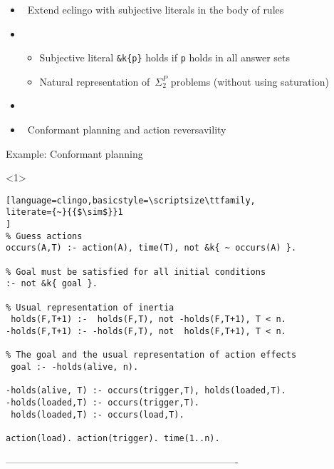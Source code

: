 \begin{frame}{\eclingo}
  \begin{itemize}
  \item {} \ Extend eclingo with subjective literals in the body of rules
  \item {} \
  \begin{itemize}
    \item Subjective literal \texttt{\&k\{p\}} holds if \texttt{p} holds in all answer sets
    \item Natural representation of~$\Sigma^P_2$ problems (without using saturation)
  \end{itemize}
  \item {} \ \cite{cafagarosc20a}
  \item {} \ Conformant planning \cite{cafafa21a} and action reversavility \cite{famoch21a}
  \end{itemize}
\end{frame}
\begin{frame}[fragile]{Example: Conformant planning}
\begin{onlyenv}<1>
\begin{lstlisting}[language=clingo,basicstyle=\scriptsize\ttfamily,
literate={~}{{$\sim$}}1
]
% Guess actions
occurs(A,T) :- action(A), time(T), not &k{ ~ occurs(A) }.

% Goal must be satisfied for all initial conditions
:- not &k{ goal }.

% Usual representation of inertia
 holds(F,T+1) :-  holds(F,T), not -holds(F,T+1), T < n.
-holds(F,T+1) :- -holds(F,T), not  holds(F,T+1), T < n.

% The goal and the usual representation of action effects
 goal :- -holds(alive, n).

-holds(alive, T) :- occurs(trigger,T), holds(loaded,T).
-holds(loaded,T) :- occurs(trigger,T).
 holds(loaded,T) :- occurs(load,T).

action(load). action(trigger). time(1..n).

\end{lstlisting}
\end{onlyenv}
\end{frame}
----------------------------------------------------------------------
%
